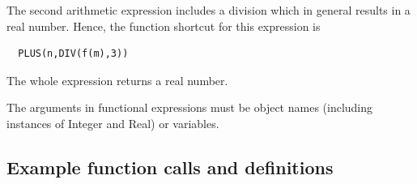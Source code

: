 The second arithmetic expression includes a division which in general results in a real number.
Hence, the function shortcut for this expression is

\begin{verbatim}
  PLUS(n,DIV(f(m),3))
\end{verbatim}
The whole expression returns a real number.

The arguments in functional expressions must be object names (including instances of Integer and Real) or variables. 



\subsection{Example function calls and definitions}

